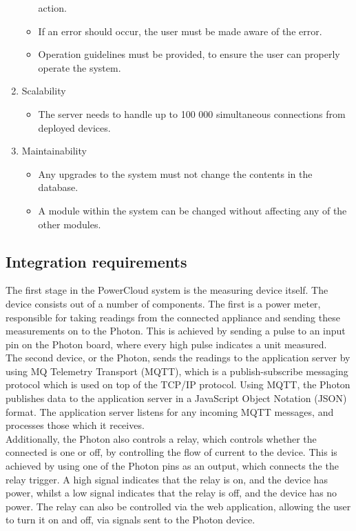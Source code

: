 \documentclass{article}
\begin{document}
\begin{enumerate}
\begin{itemize}
				action.
				\item If an error should occur, the user must be made 
				aware of the error.
				\item Operation guidelines must be provided, to ensure 
				the user can properly operate the system.
			\end{itemize}
		\item Scalability
			\begin{itemize}
				\item The server needs to handle up to 100 000 
				simultaneous connections from deployed devices.
			\end{itemize}
		\item Maintainability
			\begin{itemize}
				\item Any upgrades to the system must not change the 
				contents in the database.
				\item A module within the system can be changed without 
				affecting any of the other modules.
			\end{itemize}
	\end{enumerate}
	
	\newpage
	
	\subsection{Integration requirements}
	
	The first stage in the PowerCloud system is the measuring device itself. The device consists out of a number of components. The first is a power meter, responsible for taking readings from 
	the connected appliance and sending these measurements on to the Photon. This is achieved by sending a pulse to an input pin on the Photon board, where every high pulse indicates a unit 
	measured.\\
	
	The second device, or the Photon, sends the readings to the 
	application server by using MQ Telemetry Transport (MQTT), which is a 
	publish-subscribe messaging protocol which is used on top of the 
	TCP/IP protocol. Using MQTT, the Photon publishes data to the 
	application server in a JavaScript Object Notation (JSON) format. The 
	application server listens for any incoming MQTT messages, and 
	processes those which it receives.\\
	
	Additionally, the Photon also controls a relay, which controls 
	whether the connected is one or off, by controlling the flow of 
	current to the device. This is achieved by using one of the Photon 
	pins as an output, which connects the the relay trigger. A high 
	signal indicates that the relay is on, and the device has power, 
	whilst a low signal indicates that the relay is off, and the device 
	has no power. The relay can also be controlled via the web 
	application, allowing the user to turn it on and off, via signals 
	sent to the Photon device.\\
	
\end{document}
